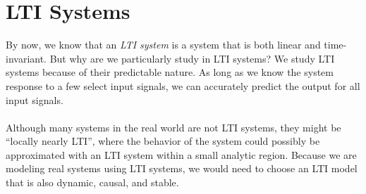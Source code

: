 \documentclass{report}
\begin{document}
\section{LTI Systems}
By now, we know that an \emph{LTI system} is a system that is both linear and time-invariant. But why are we particularly study in 
LTI systems? We study LTI systems because of their predictable nature. As long as we know the system response to a few select input signals, we can 
accurately predict the output for all input signals.
\\ \\
Although many systems in the real world are not LTI systems, they might be ``locally nearly LTI'', where the behavior of the system could possibly be approximated with 
an LTI system within a small analytic region. Because we are modeling real systems using LTI systems, we would need to choose an LTI model that is also dynamic, causal, and stable.
\end{document}
